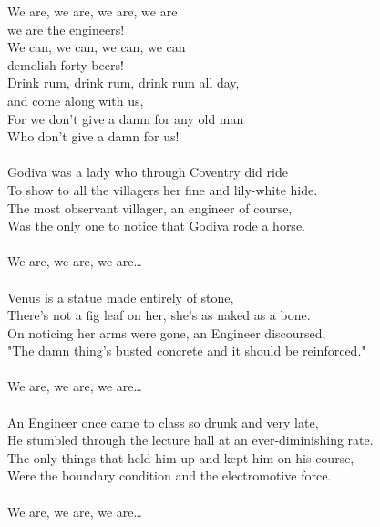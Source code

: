 
            We are, we are, we are, we are \\
            we are the engineers! \\
            We can, we can, we can, we can \\
            demolish forty beers! \\
            Drink rum, drink rum, drink rum all day, \\
            and come along with us, \\
            For we don't give a damn for any old man \\
            Who don't give a damn for us! \\
\hspace{10mm} \\
            Godiva was a lady who through Coventry did ride \\
            To show to all the villagers her fine and lily-white hide. \\
            The most observant villager, an engineer of course, \\
            Was the only one to notice that Godiva rode a horse. \\
\hspace{10mm} \\
            We are, we are, we are… \\
\hspace{10mm} \\
            Venus is a statue made entirely of stone, \\
            There's not a fig leaf on her, she's as naked as a bone. \\
            On noticing her arms were gone, an Engineer discoursed, \\
            "The damn thing's busted concrete and it should be reinforced." \\
\hspace{10mm} \\
            We are, we are, we are… \\
\hspace{10mm} \\
            An Engineer once came to class so drunk and very late, \\
            He stumbled through the lecture hall at an ever-diminishing rate. \\
            The only things that held him up and kept him on his course, \\
            Were the boundary condition and the electromotive force. \\
\hspace{10mm} \\
            We are, we are, we are… \\
